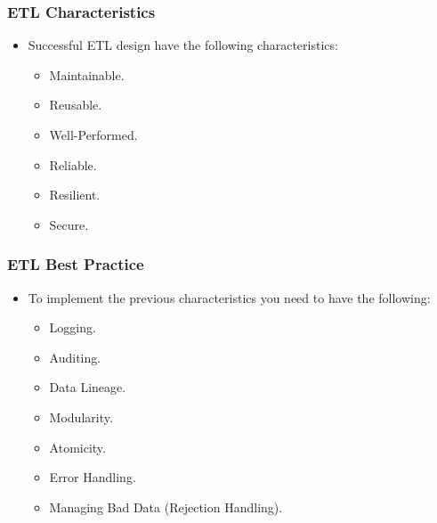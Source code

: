 \begin{frame}
\frametitle{ETL Characteristics}
\begin{itemize}[<+->]
	\item Successful ETL design have the following characteristics:
		\begin{itemize}[<+->]
			\item [\faCheckSquareO] Maintainable.
			\item [\faCheckSquareO] Reusable.
			\item [\faCheckSquareO] Well-Performed.
			\item [\faCheckSquareO] Reliable.
			\item [\faCheckSquareO] Resilient.
			\item [\faCheckSquareO] Secure.
		\end{itemize}
\end{itemize}
\end{frame}

\begin{frame}
\frametitle{ETL Best Practice}
\begin{itemize}[<+->]
	\item To implement the previous characteristics you need to have the following:
	\begin{itemize}[<+->]
		\item [\faCheckSquareO] Logging.
		
		\item [\faCheckSquareO] Auditing.
		
		\item [\faCheckSquareO] Data Lineage.
		
		\item [\faCheckSquareO] Modularity.
		
		\item [\faCheckSquareO] Atomicity.
		
		\item [\faCheckSquareO] Error Handling.
		
		\item [\faCheckSquareO] Managing Bad Data (Rejection Handling).		
	\end{itemize}
\end{itemize}
\end{frame}


